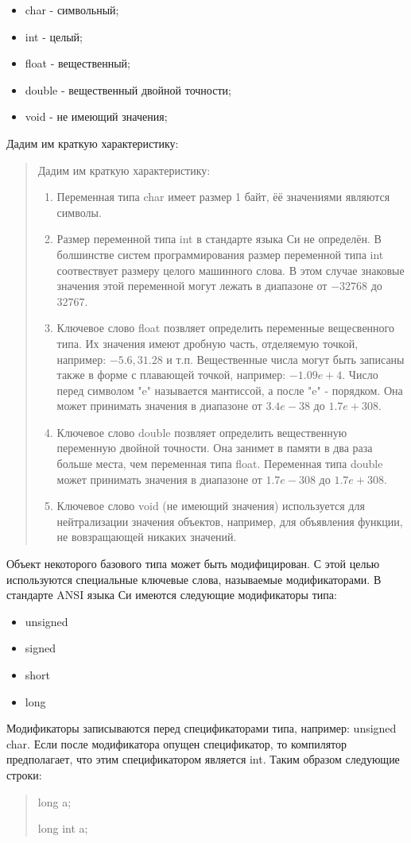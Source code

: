 \documentclass[14pt,a4paper]{article} %
\begin{document}
\begin{itemize}
    \item char - символьный;
    \item int - целый;
    \item float - вещественный;
    \item double - вещественный двойной точности;
    \item void - не имеющий значения;
\end{itemize}
Дадим им краткую характеристику:
\begin{quotation}{Дадим им краткую характеристику:}
    \begin{enumerate}
        \item Переменная типа char имеет размер 1 байт, ёё значениями являются символы.
        \item Размер переменной типа int в стандарте языка Си не определён. В болшинстве систем программирования размер переменной типа int соотвествует размеру целого машинного слова. В этом случае знаковые значения этой переменной могут лежать в диапазоне от $-32768$ до $32767$.
        \item Ключевое слово float позвляет определить переменные вещесвенного типа. Их значения имеют дробную часть, отделяемую точкой, например: $-5.6, 31.28$ и т.п. Вещественные числа могут быть записаны также в форме с плавающей точкой, например: $-1.09e+4$. Число перед символом "e" называется мантиссой, а после "e" - порядком. Она может принимать значения в диапазоне от $3.4e-38$ до $1.7e+308$.
        \item Ключевое слово double позвляет определить вещественную переменную двойной точности. Она занимет в памяти в два раза больше места, чем переменная типа float. Переменная типа double может принимать значения в диапазоне от $1.7e-308$ до $1.7e+308$.
        \item Ключевое слово void (не имеющий значения) используется для нейтрализации значения объектов, например, для объявления функции, не вовзращающей никаких значений.
    \end{enumerate}
\end{quotation}
Объект некоторого базового типа может быть модифицирован. С этой целью используются специальные ключевые слова, называемые модификаторами. В стандарте ANSI языка Си имеются следующие модификаторы типа:
\begin{itemize}
    \item unsigned
    \item signed
    \item short
    \item long
\end{itemize}   

Модификаторы записываются перед спецификаторами типа, например: unsigned char. Если после модификатора опущен спецификатор, то компилятор предполагает, что этим спецификатором является int.
Таким образом следующие строки:
\begin{quotation}
    long a;

    long int a;
\end{quotation}
\end{document}
